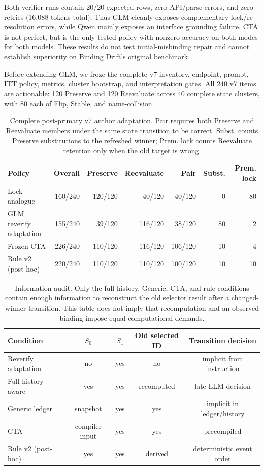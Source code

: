 \documentclass[10pt]{article}
\begin{document}
Both verifier runs contain 20/20 expected rows, zero API/parse errors, and zero retries (16,088
tokens total). Thus GLM cleanly exposes complementary lock/re-resolution errors, while Qwen mainly
exposes an interface grounding failure. CTA is not perfect, but is the only tested policy with
nonzero accuracy on both modes for both models. These results do not test initial-misbinding repair
and cannot establish superiority on Binding Drift's original benchmark.

Before extending GLM, we froze the complete v7 inventory, endpoint, prompt, ITT policy, metrics,
cluster bootstrap, and interpretation gates. All 240 v7 items are actionable: 120 Preserve and 120
Reevaluate across 40 complete state clusters, with 80 each of Flip, Stable, and name-collision.
\begin{table}[h]
\centering
\scriptsize
\begin{tabular}{lrrrrrr}
\toprule
Policy & Overall & Preserve & Reevaluate & Pair & Subst. & Prem. lock \\
\midrule
Lock analogue & 160/240 & 120/120 & 40/120 & 40/120 & 0 & 80 \\
GLM reverify adaptation & 155/240 & 39/120 & 116/120 & 38/120 & 80 & 2 \\
Frozen CTA & 226/240 & 110/120 & 116/120 & 106/120 & 10 & 4 \\
Rule v2 (post-hoc) & 220/240 & 110/120 & 110/120 & 100/120 & 10 & 10 \\
\bottomrule
\end{tabular}
\caption{Complete post-primary v7 author adaptation. Pair requires both Preserve and Reevaluate
members under the same state transition to be correct. Subst. counts Preserve substitutions to
the refreshed winner; Prem. lock counts Reevaluate retention only when the old target is wrong.}
\label{tab:supp-binding-drift-full}
\end{table}

\begin{table}[h]
\centering
\scriptsize
\begin{tabular}{lcccc}
\toprule
Condition & $S_0$ & $S_1$ & Old selected ID & Transition decision \\
\midrule
Reverify adaptation & no & yes & no & implicit from instruction \\
Full-history aware & yes & yes & recomputed & late LLM decision \\
Generic ledger & snapshot & yes & yes & implicit in ledger/history \\
CTA & compiler input & yes & yes & precompiled \\
Rule v2 (post-hoc) & yes & yes & derived & deterministic event order \\
\bottomrule
\end{tabular}
\caption{Information audit. Only the full-history, Generic, CTA, and rule conditions contain enough
information to reconstruct the old selector result after a changed-winner transition. This table
does not imply that recomputation and an observed binding impose equal computational demands.}
\label{tab:supp-information-audit}
\end{table}
\end{document}
